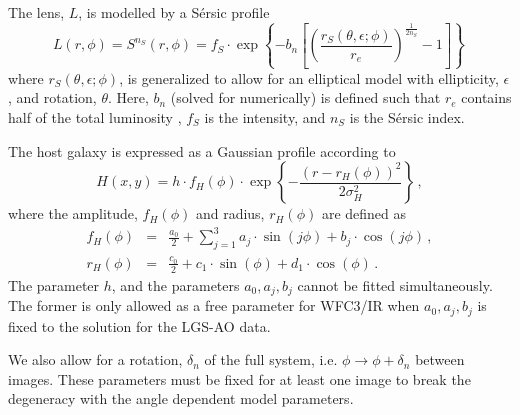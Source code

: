 \documentclass[a4paper,fleqn,usenatbib]{mnras}
\newcommand{\wfcir}{WFC3/IR\xspace}
\begin{document}
The lens, $L$, is modelled by a S\'ersic profile \citep{1963BAAA....6...41S}
\begin{equation}
	L(r,\phi) = S^{n_S}(r,\phi) = f_S\cdot \exp\left\{-b_n\left[\left(\frac{r_S(\theta,\epsilon;\phi)}{r_e}\right)^\frac{1}{2n_S} - 1\right]\right\}\,
	\label{eq:lens}
\end{equation}
where $r_S(\theta,\epsilon;\phi)$, is generalized to allow for an elliptical model with ellipticity, $\epsilon$, and rotation, $\theta$.  Here,
$b_n$ (solved for numerically) is defined such that $r_e$ contains half of the total luminosity , $f_S$ is the intensity, and $n_S$ is
the S\'ersic index.  

The host galaxy is expressed as a Gaussian profile according to
\begin{equation}
	H(x,y) = h\cdot f_H(\phi)\cdot\exp\left\{-\frac{(r - r_H(\phi))^2}{2\sigma_H^2}\right\}\, ,\label{eq:host}
\end{equation}
where  the amplitude, $f_H(\phi)$ and radius, $r_H(\phi)$ are defined as
\begin{eqnarray}
f_H(\phi) & = & \frac{a_0}{2} + \sum\limits_{j=1}^3 a_j\cdot\sin(j\phi) + b_j\cdot\cos(j\phi)\, ,\label{eq:hostflux} \\ 
r_H(\phi) & = & \frac{c_0}{2} +  c_1\cdot\sin(\phi) + d_1\cdot\cos(\phi)\, .\label{eq:hostradius}
\end{eqnarray}
The parameter $h$, and the parameters $a_0, a_j, b_j$ cannot be fitted simultaneously.  The former is only allowed as a free parameter
for \wfcir when $a_0, a_j, b_j$ is fixed to the solution for the LGS-AO data.

We also allow for a rotation, $\delta_n$ of the full system, i.e. $\phi \rightarrow \phi + \delta_n$ between images.  These parameters 
must be fixed for at least one image to break the degeneracy with the angle dependent model parameters.
\end{document}

